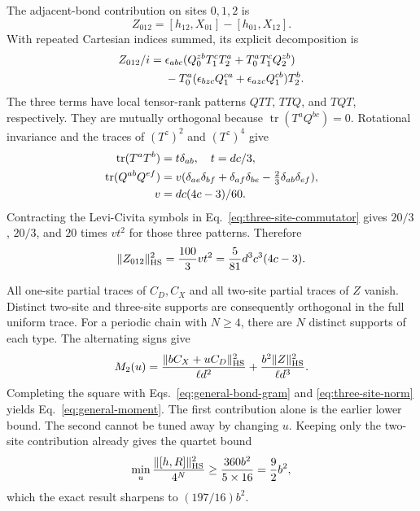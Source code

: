 The adjacent-bond contribution on sites $0,1,2$ is
\begin{equation}
 Z_{012}=[h_{12},X_{01}]-[h_{01},X_{12}].
\end{equation}
With repeated Cartesian indices summed, its explicit decomposition is
\begin{align}
 Z_{012}/i={}&\epsilon_{abc}
  (Q_0^{zb}T_1^cT_2^a+T_0^aT_1^cQ_2^{zb})\notag\\
 &-T_0^a(\epsilon_{bzc}Q_1^{ca}
                  +\epsilon_{azc}Q_1^{cb})T_2^b.
 \label{eq:three-site-commutator}
\end{align}
The three terms have local tensor-rank patterns $QTT$, $TTQ$, and
$TQT$, respectively. They are mutually orthogonal because
$\operatorname{tr}(T^aQ^{bc})=0$. Rotational invariance and the traces of
$(T^z)^2$ and $(T^z)^4$ give
\begin{align}
 \operatorname{tr}(T^aT^b)&=t\delta_{ab},\quad t=dc/3,\notag\\
 \operatorname{tr}(Q^{ab}Q^{ef})&=v(\delta_{ae}\delta_{bf}
 +\delta_{af}\delta_{be}-\tfrac23\delta_{ab}\delta_{ef}),\notag\\
 v&=dc(4c-3)/60.
\end{align}
Contracting the Levi-Civita symbols in
Eq.~\eqref{eq:three-site-commutator} gives $20/3$, $20/3$, and $20$
times $vt^2$ for those three patterns. Therefore
\begin{equation}
 \|Z_{012}\|_{\rm HS}^2=\frac{100}{3}vt^2
                      =\frac{5}{81}d^3c^3(4c-3).
 \label{eq:three-site-norm}
\end{equation}

All one-site partial traces of $C_D,C_X$ and all two-site partial traces
of $Z$ vanish. Distinct two-site and three-site supports are consequently
orthogonal in the full uniform trace. For a periodic chain with $N\ge4$,
there are $N$ distinct supports of each type. The alternating signs give
\begin{equation}
 M_2(u)=\frac{\|bC_X+uC_D\|_{\rm HS}^2}{\ell d^2}
       +\frac{b^2\|Z\|_{\rm HS}^2}{\ell d^3}.
\end{equation}
Completing the square with Eqs.~\eqref{eq:general-bond-gram} and
\eqref{eq:three-site-norm} yields Eq.~\eqref{eq:general-moment}.
The first contribution alone is the earlier lower bound. The second
cannot be tuned away by changing $u$.
Keeping only the two-site contribution already gives the quartet bound
\begin{equation}
 \min_u\frac{\|[h,R]\|_{\rm HS}^2}{4^N}
 \ge\frac{360b^2}{5\times16}=\frac92b^2,
 \label{eq:thermal-bound}
\end{equation}
which the exact result sharpens to $(197/16)b^2$.

